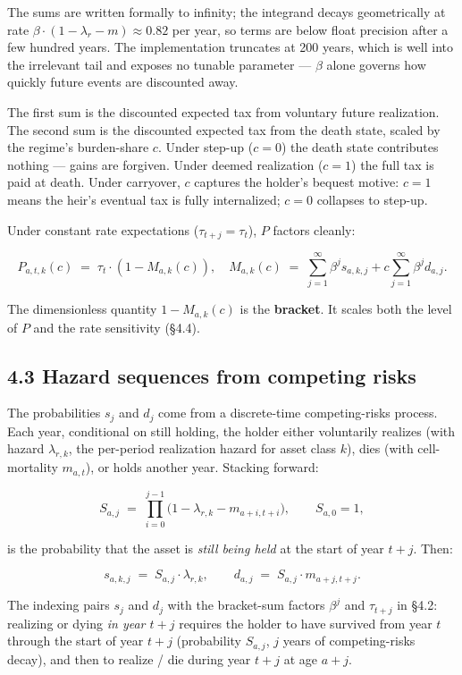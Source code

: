 \documentclass[11pt]{article}
\begin{document}
The sums are written formally to infinity; the integrand decays geometrically at rate $\beta \cdot (1 - \lambda_r - m) \approx 0.82$ per year, so terms are below float precision after a few hundred years. The implementation truncates at 200 years, which is well into the irrelevant tail and exposes no tunable parameter — $\beta$ alone governs how quickly future events are discounted away.

The first sum is the discounted expected tax from voluntary future realization. The second sum is the discounted expected tax from the death state, scaled by the regime's burden-share $c$. Under step-up ($c = 0$) the death state contributes nothing — gains are forgiven. Under deemed realization ($c = 1$) the full tax is paid at death. Under carryover, $c$ captures the holder's bequest motive: $c = 1$ means the heir's eventual tax is fully internalized; $c = 0$ collapses to step-up.

Under constant rate expectations ($\tau_{t+j} = \tau_t$), $P$ factors cleanly:

\[
P_{a,t,k}(c) \;=\; \tau_t \cdot (1 - M_{a,k}(c)), \quad
M_{a,k}(c) \;=\; \sum_{j=1}^{\infty} \beta^j s_{a,k,j} + c \sum_{j=1}^{\infty} \beta^j d_{a,j}.
\]

The dimensionless quantity $1 - M_{a,k}(c)$ is the \textbf{bracket}. It scales both the level of $P$ and the rate sensitivity (§4.4).

\subsection*{4.3 Hazard sequences from competing risks}

The probabilities $s_j$ and $d_j$ come from a discrete-time competing-risks process. Each year, conditional on still holding, the holder either voluntarily realizes (with hazard $\lambda_{r,k}$, the per-period realization hazard for asset class $k$), dies (with cell-mortality $m_{a,t}$), or holds another year. Stacking forward:

\[
S_{a, j} \;=\; \prod_{i=0}^{j-1} \big(1 - \lambda_{r, k} - m_{a+i, t+i}\big),
\qquad S_{a,0} = 1,
\]

is the probability that the asset is \emph{still being held} at the start of year $t + j$. Then:

\[
s_{a,k,j} \;=\; S_{a, j} \cdot \lambda_{r,k},
\qquad
d_{a,j} \;=\; S_{a, j} \cdot m_{a+j, t+j}.
\]

The indexing pairs $s_j$ and $d_j$ with the bracket-sum factors $\beta^j$ and $\tau_{t+j}$ in §4.2: realizing or dying \emph{in year $t+j$} requires the holder to have survived from year $t$ through the start of year $t+j$ (probability $S_{a,j}$, $j$ years of competing-risks decay), and then to realize / die during year $t+j$ at age $a+j$.
\end{document}
